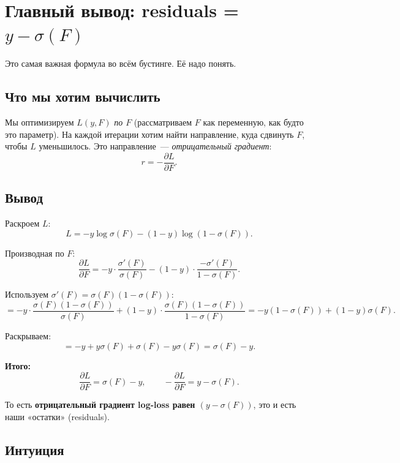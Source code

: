 \documentclass[12pt,a4paper]{article}
\begin{document}
\section{Главный вывод: residuals = $y - \sigma(F)$}

Это самая важная формула во всём бустинге. Её надо понять.

\subsection{Что мы хотим вычислить}

Мы оптимизируем $L(y, F)$ \emph{по $F$} (рассматриваем $F$ как переменную, как будто это параметр). На каждой итерации хотим найти направление, куда сдвинуть $F$, чтобы $L$ уменьшилось. Это направление~--- \emph{отрицательный градиент}:
\[
  r = -\frac{\partial L}{\partial F}.
\]

\subsection{Вывод}

\begin{derivation}
Раскроем $L$:
\[
  L = -y \log \sigma(F) - (1-y)\log(1 - \sigma(F)).
\]

Производная по $F$:
\[
  \frac{\partial L}{\partial F}
  = -y \cdot \frac{\sigma'(F)}{\sigma(F)} - (1-y) \cdot \frac{-\sigma'(F)}{1 - \sigma(F)}.
\]

Используем $\sigma'(F) = \sigma(F)(1 - \sigma(F))$:
\[
  = -y \cdot \frac{\sigma(F)(1-\sigma(F))}{\sigma(F)} + (1-y) \cdot \frac{\sigma(F)(1-\sigma(F))}{1-\sigma(F)}
  = -y(1 - \sigma(F)) + (1-y)\sigma(F).
\]

Раскрываем:
\[
  = -y + y\sigma(F) + \sigma(F) - y\sigma(F) = \sigma(F) - y.
\]

\textbf{Итого:}
\[
  \frac{\partial L}{\partial F} = \sigma(F) - y,
  \qquad
  -\frac{\partial L}{\partial F} = y - \sigma(F).
\]
\end{derivation}

То есть \textbf{отрицательный градиент log-loss равен $(y - \sigma(F))$}, это и есть наши «остатки» (residuals).

\subsection{Интуиция}
\end{document}
